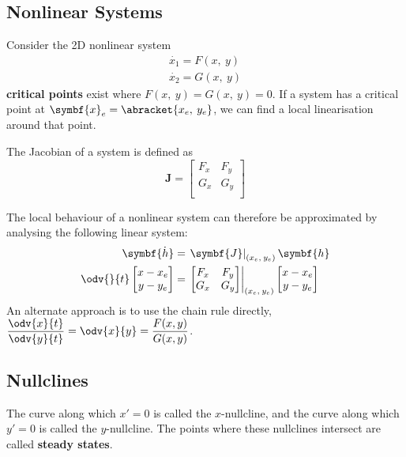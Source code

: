 \documentclass{article}
\begin{document}
\subsection{Nonlinear Systems}
Consider the 2D nonlinear system
\begin{align*}
    \dot{x_1} = F\left( x,\: y \right) \\
    \dot{x_2} = G\left( x,\: y \right)
\end{align*}
\textbf{critical points} exist where \(F\left( x,\: y \right) = G\left( x,\: y \right) = 0\).
If a system has a critical point at \(\symbf{x}_e = \abracket{x_e,\: y_e}\),
we can find a local linearisation around that point.
\begin{definition}[Jacobian]
    The Jacobian of a system is defined as
    \begin{equation*}
        \symbf{J} = \begin{bmatrix}
            F_x & F_y \\
            G_x & G_y \\
        \end{bmatrix}
    \end{equation*}
\end{definition}
The local behaviour of a nonlinear system can therefore be approximated by analysing the following linear system:
\begin{align*}
    \symbf{\dot{h}}                                            & = \left.\symbf{J}\right|_{\left( x_e,\: y_e \right)} \symbf{h} \\
    \odv{}{t} \begin{bmatrix} x - x_e \\ y - y_e \end{bmatrix} & =
    \left.\begin{bmatrix}
              F_x & F_y \\
              G_x & G_y \\
          \end{bmatrix}\right|_{\left( x_e,\: y_e \right)}
    \begin{bmatrix} x - x_e \\ y - y_e \end{bmatrix}
\end{align*}
An alternate approach is to use the chain rule directly,
\(\displaystyle\frac{\odv{x}{t}}{\odv{y}{t}} = \odv{x}{y} = \frac{F(x,y)}{G(x,y)}\).
\subsection{Nullclines}
The curve along which \(x' = 0\) is called the \(x\)-nullcline,
and the curve along which \(y' = 0\) is called the \(y\)-nullcline.
The points where these nullclines intersect are called \textbf{steady states}.
\end{document}

